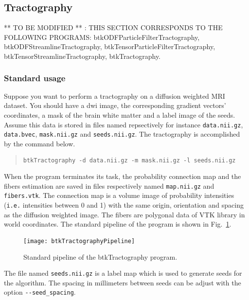\subsection{Tractography \cite{pontabry_probabilistic_2011}}
\label{subsec:tracto}

** TO BE MODIFIED ** : THIS SECTION CORRESPONDS TO THE FOLLOWING PROGRAMS: btkODFParticleFilterTractography, btkODFStreamlineTractography, btkTensorParticleFilterTractography, btkTensorStreamlineTractography, btkTractography.

    \subsubsection*{Standard usage}
        Suppose you want to perform a tractography on a diffusion weighted MRI 
dataset. You should have a dwi image, the corresponding gradient vectors'
coordinates, a mask of the brain white matter and a label image of the seeds.
Assume this data is stored in files named repsectively for instance
\texttt{data.nii.gz}, \texttt{data.bvec}, \texttt{mask.nii.gz} and
\texttt{seeds.nii.gz}. The tractography is accomplished by the command below.
            \begin{quote}
                \texttt{btkTractography -d data.nii.gz -m mask.nii.gz -l seeds.nii.gz}
            \end{quote}
        When the program terminates its task, the probability connection map and
        the fibers estimation are saved in files respectively named
\texttt{map.nii.gz} and \texttt{fibers.vtk}. The connection map is a volume
image of probability intensities (\texttt{i.e.} intensities between 0 and 1)
with the same origin, orientation and spacing as the diffusion weighted image.
The fibers are polygonal data of VTK library in world coordinates. The standard
pipeline of the program is shown in
Fig.~\ref{btkTractography-fig:standard-pipeline}.
            \begin{figure}
                \centering
                \texttt{[image: btkTractographyPipeline]}
                \caption{Standard pipeline of the btkTractography program.}
                \label{btkTractography-fig:standard-pipeline}
            \end{figure}

        The file named \texttt{seeds.nii.gz} is a label map which is used to 
        generate seeds for the algorithm. The spacing in millimeters between
seeds can be adjust with the option \texttt{-\hspace{0.1mm}-seed\_spacing}.

